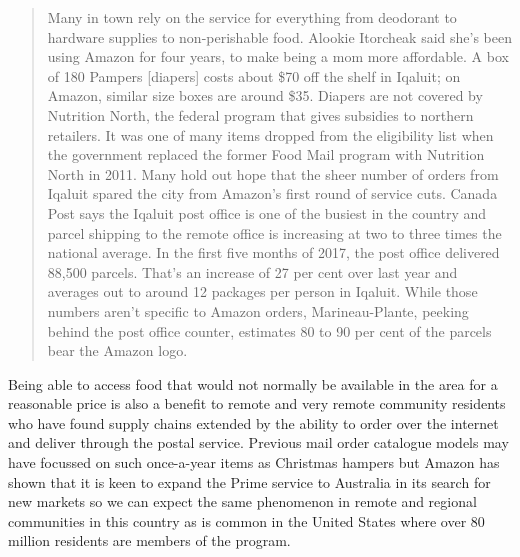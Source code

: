 \begin{quotation}
Many in town rely on the service for everything from deodorant to hardware supplies to non-perishable food.  Alookie Itorcheak said she's been using Amazon for four years, to make being a mom more affordable.  
A box of 180 Pampers [diapers] costs about \$70 off the shelf in Iqaluit; on Amazon, similar size boxes are around \$35.  
Diapers are not covered by Nutrition North, the federal program that gives subsidies to northern retailers. It was one of many items dropped from the eligibility list when the government replaced the former Food Mail program with Nutrition North in 2011.  
Many hold out hope that the sheer number of orders from Iqaluit spared the city from Amazon's first round of service cuts.  
Canada Post says the Iqaluit post office is one of the busiest in the country and parcel shipping to the remote office is increasing at two to three times the national average.  In the first five months of 2017, the post office delivered 88,500 parcels. That's an increase of 27 per cent over last year and averages out to around 12 packages per person in Iqaluit. While those numbers aren't specific to Amazon orders, Marineau-Plante, peeking behind the post office counter, estimates 80 to 90 per cent of the parcels bear the Amazon logo\cite{RefWorks:332}.
\end{quotation}
Being able to access food that would not normally be available in the area for a reasonable price is also a benefit to remote and very remote community residents who have found supply chains extended by the ability to order over the internet and deliver through the postal service. Previous mail order catalogue models may have focussed on such once-a-year items as Christmas hampers but Amazon has shown that it is keen to expand the Prime service to Australia in its search for new markets so we can expect the same phenomenon in remote and regional communities in this country as is common in the United States where over 80 million residents are members of the program\cite{RefWorks:333}.


